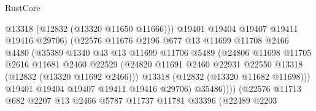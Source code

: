 \begin{lexlean}{RustCore}
\begin{coremodule}
                                      @13318
                                      (@12832 (@13320 @11650 @11666)))
                                    @19401
                                    @19404
                                    @19407
                                    @19411
                                    @19416
                                    @29706)
                                  (@22576
                                    @11676
                                    @2196
                                    @677
                                    @13
                                    @11699
                                    @11708
                                    @2466
                                    @4480
                                    (@35389
                                      @1340
                                      @43
                                      @13
                                      @11699
                                      @11706
                                      @5489
                                      (@24806
                                        @11698
                                        @11705
                                        @2616
                                        @11681
                                        @2460
                                        @22529
                                        (@24820
                                          @11691
                                          @2460
                                          @22931
                                          @22550
                                          @13318
                                          (@12832 (@13320 @11692 @2466)))
                                        @13318
                                        (@12832 (@13320 @11682 @11698)))
                                      @19401
                                      @19404
                                      @19407
                                      @19411
                                      @19416
                                      @29706)
                                    @35486))))
                            (@22576
                              @11713
                              @682
                              @2207
                              @13
                              @2466
                              @5787
                              @11737
                              @11781
                              @33396
                              (@22489
                                @2203

\end{coremodule}
\end{lexlean}
